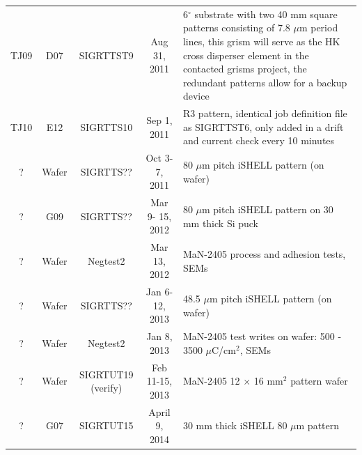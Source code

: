 \documentclass[]{spie}  %
\begin{document}
\begin{landscape}
\begin{longtable}{ccccp{8cm}}
	\cline{5-5}
	TJ09 & D07 & SIGRTTST9 & Aug 31, 2011 & 6$^{\circ}$ substrate with two 40 mm square patterns consisting of 7.8 $\mu$m period lines, this grism will serve as the HK cross disperser element in the contacted grisms project, the redundant patterns allow for a backup device\\	
	\cline{5-5}
	TJ10 & E12 & SIGRTTS10 & Sep 1, 2011 & R3 pattern, identical job definition file as SIGRTTST6, only added in a drift and current check every 10 minutes\\
	\cline{5-5}
	? & Wafer & SIGRTTS?? & Oct 3-7, 2011 & 80 $\mu$m pitch iSHELL pattern (on wafer) \\
	\cline{5-5}
	? & G09 & SIGRTTS?? & Mar 9- 15, 2012 & 80 $\mu$m pitch iSHELL pattern on 30 mm thick Si puck \\	
	\cline{5-5}
	? & Wafer & Negtest2 & Mar 13, 2012 & MaN-2405 process and adhesion tests, SEMs\\		
	\cline{5-5}
	? & Wafer & SIGRTTS?? & Jan 6-12, 2013 & 48.5 $\mu$m pitch iSHELL pattern (on wafer) \\		
	\cline{5-5}
	? & Wafer & Negtest2 & Jan 8, 2013 & MaN-2405 test writes on wafer: 500 - 3500 $\mu$C/cm$^2$, SEMs\\
	\cline{5-5}
	? & Wafer & SIGRTUT19 (verify) & Feb 11-15, 2013 & MaN-2405 12 $\times$ 16 mm$^2$ pattern wafer\\	
	\cline{5-5}
	? & G07 & SIGRTUT15 & April 9, 2014 & 30 mm thick iSHELL 80 $\mu$m pattern\\
	\hline
\end{longtable}
\end{landscape}	



\end{document}

